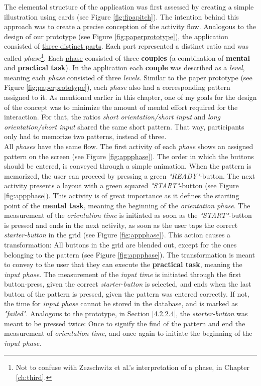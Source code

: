 The elemental structure of the application was first assessed by creating a simple illustration using cards (see Figure \ref{fig:fipapitch}). The intention behind this approach was to create a precise conception of the activity flow. Analogous to the design of our prototype (see Figure \ref{fig:paperprototype}), the application consisted of \underline{three distinct parts}. Each part represented a distinct ratio and was called  \textit{phase}\footnote{Not to confuse with Zezschwitz et al.'s interpretation of a phase, in Chapter \ref{ch:third}.}. 
Each \underline{phase} consisted of three \textbf{couples} (a combination of \textbf{mental} and \textbf{practical task}). In the application each \textbf{couple} was described as a \textit{level}, meaning each \textit{phase} consisted of three \textit{levels}. Similar to the paper prototype (see Figure \ref{fig:paperprototype}), each \textit{phase} also had a corresponding pattern assigned to it. As mentioned earlier in this chapter, one of my goals for the design of the concept was to minimize the amount of mental effort required for the interaction. For that, the ratios \textit{short orientation/short input} and \textit{long orientation/short input} shared the same short pattern. That way, participants only had to memorize two patterns, instead of three.\\

All \textit{phases} have the same flow. The first activity of each \textit{phase} shows an assigned pattern on the screen (see Figure \ref{fig:appphase}). The order in which the buttons should be entered, is conveyed through a simple animation. When the pattern is memorized, the user can proceed by pressing a green \textit{"READY"}-button. The next activity presents a layout with a green squared \textit{"START"}-button (see Figure \ref{fig:appphase}). This activity is of great importance as it defines the starting point of the \textbf{mental task}, meaning the beginning of the \textit{orientation phase}. The measurement of the \textit{orientation time} is initiated as soon as the \textit{"START"}-button is pressed and ends in the next activity, as soon as the user taps the correct \textit{starter-button} in the grid (see Figure \ref{fig:appphase}). This action causes a transformation: All buttons in the grid are blended out, except for the ones belonging to the pattern (see Figure \ref{fig:appphase}). The transformation is meant to convey to the user that they can execute the \textbf{practical task}, meaning the \textit{input phase}. The measurement of the \textit{input time} is initiated through the first button-press, given the correct \textit{starter-button} is selected, and ends when the last button of the pattern is pressed, given the pattern was entered correctly. If not, the time for \textit{input phase} cannot be stored in the database, and is marked as \textit{"failed"}. Analogous to the prototype, in Section \ref{4.2.2.4}, the \textit{starter-button} was meant to be pressed twice: Once to signify the find of the pattern and end the measurement of \textit{orientation time}, and once again to initiate the beginning of the \textit{input phase}. 

